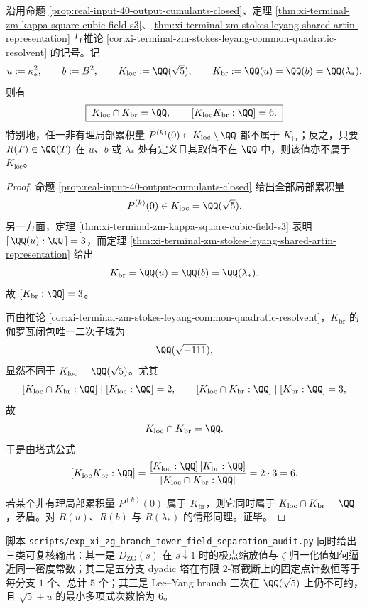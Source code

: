 \begin{theorem}\label{thm:xi-time-part62a-local-cumulant-branch-cubic-linear-disjointness}
沿用命题 \ref{prop:real-input-40-output-cumulants-closed}、定理 \ref{thm:xi-terminal-zm-kappa-square-cubic-field-s3}、\ref{thm:xi-terminal-zm-stokes-leyang-shared-artin-representation} 与推论 \ref{cor:xi-terminal-zm-stokes-leyang-common-quadratic-resolvent} 的记号。记
\[
u:=\kappa_*^2,
\qquad
b:=B^2,
\qquad
K_{\mathrm{loc}}:=\QQ(\sqrt5),
\qquad
K_{\mathrm{br}}:=\QQ(u)=\QQ(b)=\QQ(\lambda_*).
\]
则有
\[
\boxed{\;
K_{\mathrm{loc}}\cap K_{\mathrm{br}}=\QQ,
\qquad
[K_{\mathrm{loc}}K_{\mathrm{br}}:\QQ]=6.
\;}
\]
特别地，任一非有理局部累积量
\(
P^{(k)}(0)\in K_{\mathrm{loc}}\setminus\QQ
\)
都不属于 \(K_{\mathrm{br}}\)；反之，只要 \(R(T)\in\QQ(T)\) 在 \(u\)、\(b\) 或 \(\lambda_*\) 处有定义且其取值不在 \(\QQ\) 中，则该值亦不属于 \(K_{\mathrm{loc}}\)。
\end{theorem}
\begin{proof}
命题 \ref{prop:real-input-40-output-cumulants-closed} 给出全部局部累积量
\[
P^{(k)}(0)\in K_{\mathrm{loc}}=\QQ(\sqrt5).
\]
另一方面，定理 \ref{thm:xi-terminal-zm-kappa-square-cubic-field-s3} 表明 \([\,\QQ(u):\QQ\,]=3\)，而定理
\ref{thm:xi-terminal-zm-stokes-leyang-shared-artin-representation} 给出
\[
K_{\mathrm{br}}=\QQ(u)=\QQ(b)=\QQ(\lambda_*).
\]
故 \([K_{\mathrm{br}}:\QQ]=3\)。

再由推论 \ref{cor:xi-terminal-zm-stokes-leyang-common-quadratic-resolvent}，\(K_{\mathrm{br}}\) 的伽罗瓦闭包唯一二次子域为
\[
\QQ(\sqrt{-111}),
\]
显然不同于 \(K_{\mathrm{loc}}=\QQ(\sqrt5)\)。尤其
\[
[K_{\mathrm{loc}}\cap K_{\mathrm{br}}:\QQ]
\mid
[K_{\mathrm{loc}}:\QQ]=2,
\qquad
[K_{\mathrm{loc}}\cap K_{\mathrm{br}}:\QQ]
\mid
[K_{\mathrm{br}}:\QQ]=3,
\]
故
\[
K_{\mathrm{loc}}\cap K_{\mathrm{br}}=\QQ.
\]
于是由塔式公式
\[
[K_{\mathrm{loc}}K_{\mathrm{br}}:\QQ]
=
\frac{[K_{\mathrm{loc}}:\QQ]\,[K_{\mathrm{br}}:\QQ]}
{[K_{\mathrm{loc}}\cap K_{\mathrm{br}}:\QQ]}
=2\cdot 3=6.
\]

若某个非有理局部累积量 \(P^{(k)}(0)\) 属于 \(K_{\mathrm{br}}\)，则它同时属于
\(
K_{\mathrm{loc}}\cap K_{\mathrm{br}}=\QQ
\)，矛盾。对 \(R(u)\)、\(R(b)\) 与 \(R(\lambda_*)\) 的情形同理。证毕。
\end{proof}

\begin{remark}[有限层审计接口]\label{rem:xi-time-part62a-zg-branch-field-audit}
脚本 \texttt{scripts/exp\_xi\_zg\_branch\_tower\_field\_separation\_audit.py}
同时给出三类可复核输出：其一是 \(D_{\mathrm{ZG}}(s)\) 在 \(s\downarrow 1\) 时的极点缩放值与 \(\zeta\)-归一化值如何逼近同一密度常数；其二是五分支 dyadic 塔在有限 \(2\)-幂截断上的固定点计数恒等于每分支 \(1\) 个、总计 \(5\) 个；其三是 Lee--Yang branch 三次在 \(\QQ(\sqrt5)\) 上仍不可约，且 \(\sqrt5+u\) 的最小多项式次数恰为 \(6\)。
\end{remark}

\endinput

